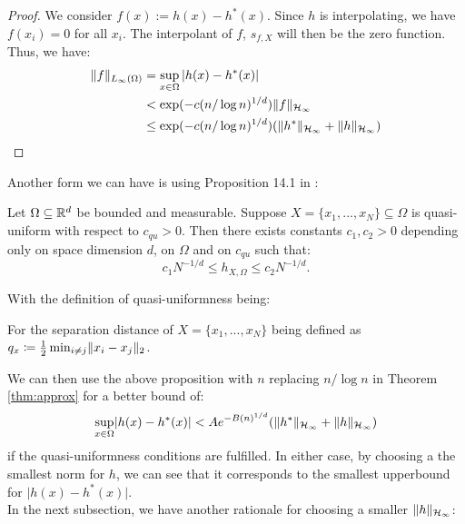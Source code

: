 \documentclass[twoside]{memoir}
\begin{document}
\begin{proof}
	We consider $f(x) := h(x) - h^*(x)$. Since $h$ is interpolating, we have $f(x_i) = 0$ for all $x_i$. The interpolant of $f$, $s_{f,X}$ will then be the zero function. Thus, we have:
	\begin{equation*}
	\begin{split}
	\lVert f\rVert_{L_\infty(\Omega)} &= \sup_{x \in \Omega} \vert h(x) - h^*(x)\vert \\
	&< \exp(-c(n/\log n)^{1/d})\lVert f\rVert_{\mathcal{H}_\infty} \\
	&\leq \exp(-c(n/\log n)^{1/d}) (\lVert h^*\rVert_{\mathcal{H}_\infty} + \lVert h\rVert_{\mathcal{H}_\infty})
	\end{split}
	\end{equation*}
\end{proof}
Another form we can have is using Proposition 14.1 in \cite{ScatteredDataApproximation}:
\begin{prop}
	Let $\Omega \subseteq \mathbb{R}^d$ be bounded and measurable. Suppose $X = \{x_1, ... , x_N\} \subseteq \Omega$ is quasi-uniform with respect to  $c_{qu} > 0$. Then there exists constants $c_1, c_2 > 0$ depending only on space dimension $d$, on $\Omega$ and on $c_{qu}$ such that:
	\[c_1N^{-1/d} \leq h_{X,\Omega} \leq c_2N^{-1/d}. \]
\end{prop}
With the definition of quasi-uniformness being:
\begin{defn}
	For the separation distance of $X = \{x_1, ... , x_N\}$ being defined as $q_x \coloneqq \frac{1}{2} \min_{i\neq j} \lVert x_i - x_j\rVert_2$.
\end{defn}
We can then use the above proposition with $n$ replacing $n/\log n$ in Theorem \ref{thm:approx} for a better bound of:
\[ \sup_{x \in \Omega} \lvert h(x) - h^*(x)\rvert < A e^{-B(n)^{1/d}} (\lVert h^*\rVert_{\mathcal{H}_\infty} + \lVert h\rVert_{\mathcal{H}_\infty}) \]
if the quasi-uniformness conditions are fulfilled.
In either case, by choosing a the smallest norm for $h$, we can see that it corresponds to the smallest upperbound for $\vert h(x) - h^*(x)\vert$. \\
In the next subsection, we have another rationale for choosing a smaller $\lVert h\rVert_{\mathcal{H}_\infty}$:
\end{document}

